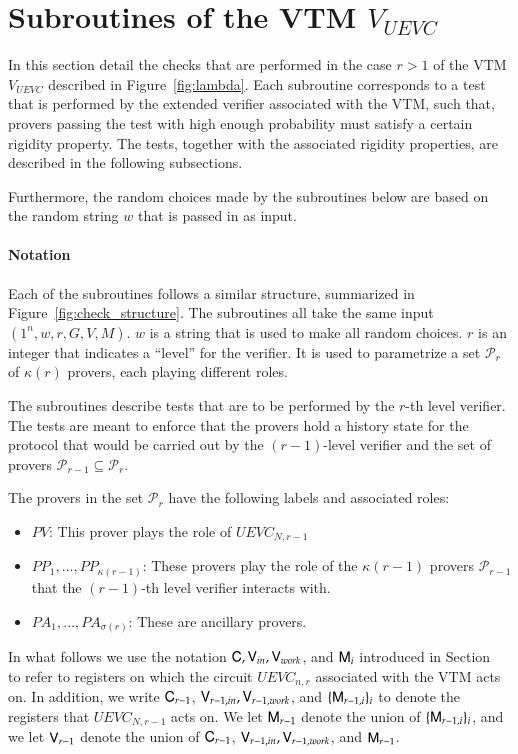 
\section{Subroutines of the VTM $V_{UEVC}$}

In this section detail the checks that are performed in the case $r>1$ of the VTM $V_{UEVC}$ described in Figure~\ref{fig:lambda}. Each subroutine corresponds to a test that is performed by the extended verifier associated with the VTM, such that, provers passing the test with high enough probability must satisfy a certain rigidity property. The tests, together with the associated rigidity properties, are described in the following subsections. 

Furthermore, the random choices made by the subroutines below are based on the random string $w$ that is passed in as input. 

\paragraph{Notation} Each of the subroutines follows a similar structure, summarized in Figure~\ref{fig:check_structure}. The subroutines all take the same input $(1^n,w,r,G,V,M)$. $w$ is a string that is used to make all random choices. $r$ is an integer that indicates a ``level'' for the verifier. It is used to parametrize a set $\mathcal{P}_r$ of $\kappa(r)$ provers, each playing different roles. 

The subroutines describe tests that are to be performed by the $r$-th level verifier. The tests are meant to enforce that the provers hold a history state for the protocol that would be carried out by the $(r-1)$-level verifier and the set of provers $\mathcal{P}_{r-1} \subseteq \mathcal{P}_r$. 

The provers in the set $\mathcal{P}_r$ have the following labels and associated roles:
\begin{itemize}
	\item $PV$: This prover plays the role of $UEVC_{N,r-1}$
	\item $PP_1,\ldots,PP_{\kappa(r-1)}$: These provers play the role of the $\kappa(r-1)$ provers $\mathcal{P}_{r-1}$ that the $(r-1)$-th level verifier interacts with.
	\item $PA_1,\ldots,PA_{\sigma(r)}$: These are ancillary provers.
\end{itemize}

In what follows we use the notation ${\mathsf{C}},{\mathsf{V}}_{in},{\mathsf{V}}_{work}$, and ${\mathsf{M}}_i$ introduced in Section~\label{sec:specs} to refer to registers on which the circuit $UEVC_{n,r}$ associated with the VTM acts on. In addition, we write ${\mathsf{C}}_{r-1}$, ${\mathsf{V}}_{r-1,in},{\mathsf{V}}_{r-1,work}$, and $\{ {\mathsf{M}}_{r-1,i} \}_i$ to denote the registers that $UEVC_{N,r-1}$ acts on. We let ${\mathsf{M}}_{r-1}$ denote the union of $\{ {\mathsf{M}}_{r-1,i} \}_i$, and we let ${\mathsf{V}}_{r-1}$ denote the union of ${\mathsf{C}}_{r-1}$, ${\mathsf{V}}_{r-1,in},{\mathsf{V}}_{r-1,work}$, and ${\mathsf{M}}_{r-1}$. 

